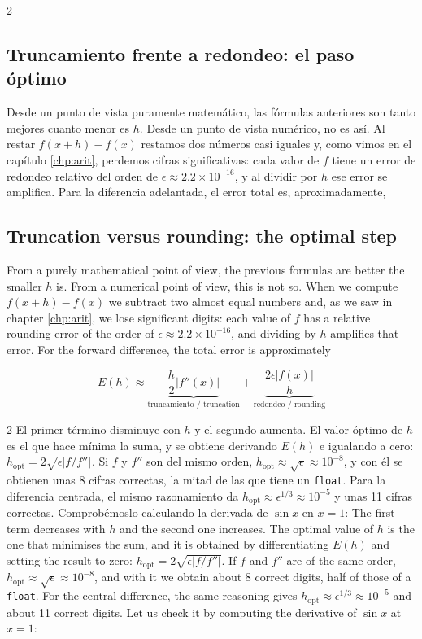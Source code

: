 \begin{paracol}{2}
\subsection{Truncamiento frente a redondeo: el paso óptimo}\label{sec:paso_optimo}
Desde un punto de vista puramente matemático, las fórmulas anteriores son tanto mejores cuanto menor es $h$. Desde un punto de vista numérico, no es así. Al restar $f(x+h)-f(x)$ restamos dos números casi iguales y, como vimos en el capítulo \ref{chp:arit}, perdemos cifras significativas: cada valor de $f$ tiene un error de redondeo relativo del orden de $\epsilon\approx 2.2\times 10^{-16}$, y al dividir por $h$ ese error se amplifica. Para la diferencia adelantada, el error total es, aproximadamente,
\switchcolumn
\subsection{Truncation versus rounding: the optimal step}\label{sec:paso_optimo-2}
From a purely mathematical point of view, the previous formulas are better the smaller $h$ is. From a numerical point of view, this is not so. When we compute $f(x+h)-f(x)$ we subtract two almost equal numbers and, as we saw in chapter \ref{chp:arit}, we lose significant digits: each value of $f$ has a relative rounding error of the order of $\epsilon\approx 2.2\times 10^{-16}$, and dividing by $h$ amplifies that error. For the forward difference, the total error is approximately
\end{paracol}
\begin{equation*}
E(h)\approx\underbrace{\frac{h}{2}\lvert f''(x)\rvert}_{\text{truncamiento / truncation}}+\underbrace{\frac{2\epsilon\lvert f(x)\rvert}{h}}_{\text{redondeo / rounding}}
\end{equation*}
\begin{paracol}{2}
El primer término disminuye con $h$ y el segundo aumenta. El valor óptimo de $h$ es el que hace mínima la suma, y se obtiene derivando $E(h)$ e igualando a cero: $h_{\text{opt}}=2\sqrt{\epsilon\lvert f/f''\rvert}$. Si $f$ y $f''$ son del mismo orden, $h_{\text{opt}}\approx\sqrt{\epsilon}\approx 10^{-8}$, y con él se obtienen unas 8 cifras correctas, la mitad de las que tiene un \texttt{float}. Para la diferencia centrada, el mismo razonamiento da $h_{\text{opt}}\approx\epsilon^{1/3}\approx 10^{-5}$ y unas 11 cifras correctas. Comprobémoslo calculando la derivada de $\sin x$ en $x=1$:
\switchcolumn
The first term decreases with $h$ and the second one increases. The optimal value of $h$ is the one that minimises the sum, and it is obtained by differentiating $E(h)$ and setting the result to zero: $h_{\text{opt}}=2\sqrt{\epsilon\lvert f/f''\rvert}$. If $f$ and $f''$ are of the same order, $h_{\text{opt}}\approx\sqrt{\epsilon}\approx 10^{-8}$, and with it we obtain about 8 correct digits, half of those of a \texttt{float}. For the central difference, the same reasoning gives $h_{\text{opt}}\approx\epsilon^{1/3}\approx 10^{-5}$ and about 11 correct digits. Let us check it by computing the derivative of $\sin x$ at $x=1$:
\end{paracol}
